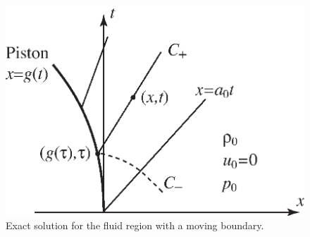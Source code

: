 \begin{figure}[hbt]
 \begin{center}
 \includegraphics[width=3.in]{pistonExact.eps}
\end{center}
\caption{Exact solution for the fluid region with a moving boundary.}
\label{fig:fluidSolidCartoon}
\end{figure}
